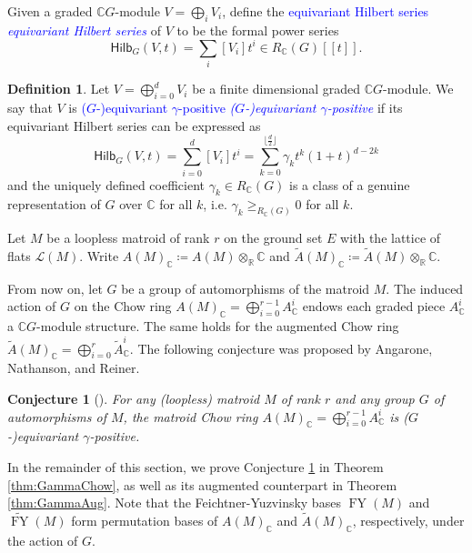 \documentclass[reqno]{amsart}
\newcommand{\defin}[1]{%
\relax\ifmmode%
\textcolor{blue}{#1}%
\else\textcolor{blue}{\emph{#1}}%
\fi%
}
\renewcommand{\L}{{\mathcal{L}}}
\newcommand{\Hilb}{{\mathsf{Hilb}}}
\newcommand{\FY}{\operatorname{FY}}
\newtheorem{conj}[thm]{Conjecture}
\theoremstyle{definition}
\newtheorem{defi}[thm]{Definition}
\theoremstyle{remark}
\begin{document}
Given a graded $\mathbb{C}G$-module $V=\bigoplus_{i} V_i$, define the \defin{equivariant Hilbert series} of $V$ to be the formal power series 
\[
    \Hilb_{G}(V,t)=\sum_{i}[V_i] t^i\in R_{\mathbb{C}}(G)[[t]].
\]
 
\begin{defi}
Let $V=\bigoplus_{i=0}^d V_i$ be a finite dimensional graded $\mathbb{C}G$-module. 
We say that $V$ is \defin{($G$-)equivariant $\gamma$-positive} if its equivariant Hilbert series can be expressed as 
\[
    \Hilb_G(V,t)=\sum_{i=0}^d[V_i]t^i=\sum_{k=0}^{\lfloor\frac{d}{2}\rfloor}\gamma_k t^k(1+t)^{d-2k}
\]
and the uniquely defined coefficient $\gamma_k\in R_{\mathbb{C}}(G)$ is a class of a genuine representation of $G$ over $\mathbb{C}$ for all $k$, i.e. $\gamma_k\ge_{R_{\mathbb{C}}(G)}0$ for all $k$.    
\end{defi}

Let $M$ be a loopless matroid of rank $r$ on the ground set $E$ with the lattice of flats $\L(M)$. Write $A(M)_\mathbb{C}\coloneqq A(M)\otimes_{\mathbb{R}}\mathbb{C}$ and $\widetilde{A}(M)_\mathbb{C}\coloneqq \widetilde{A}(M)\otimes_{\mathbb{R}}\mathbb{C}$. 

From now on, let $G$ be a group of automorphisms of the matroid $M$.
The induced action of $G$ on the Chow ring $A(M)_{\mathbb{C}}=\bigoplus_{i=0}^{r-1}A_{\mathbb{C}}^i$ endows each graded piece $A_{\mathbb{C}}^i$ a $\mathbb{C}G$-module structure. The same holds for the augmented Chow ring $\widetilde{A}(M)_{\mathbb{C}}=\bigoplus_{i=0}^r\widetilde{A}^i_{\mathbb{C}}$. 
The following conjecture was proposed by Angarone, Nathanson, and Reiner.

\begin{conj}[{\cite[Conjecture 5.2] {ANR2023PermRepchow}}] \label{conj:Equiv}
For any (loopless) matroid $M$ of rank $r$ and any group $G$ of automorphisms of $M$, the matroid Chow ring $A(M)_{\mathbb{C}}=\bigoplus_{i=0}^{r-1}A^i_{\mathbb{C}}$ is ($G$-)equivariant $\gamma$-positive. 
\end{conj}

In the remainder of this section, we prove Conjecture \ref{conj:Equiv} in Theorem \ref{thm:GammaChow}, as well as its augmented counterpart in Theorem \ref{thm:GammaAug}.
Note that the Feichtner-Yuzvinsky bases $\FY(M)$ and $\widetilde{\FY}(M)$ form permutation bases of $A(M)_{\mathbb{C}}$ and $\widetilde{A}(M)_{\mathbb{C}}$, respectively, under the action of $G$.
\end{document}

